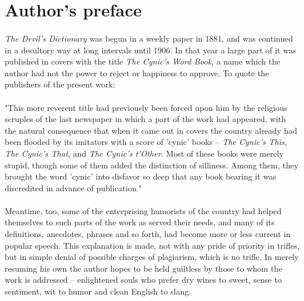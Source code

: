 \documentclass[11pt]{article}
\begin{document}
\newpage



\vspace*{7 cm}

\section*{Author's preface}

\paragraph{}
{\em The Devil's Dictionary} was begun in a weekly paper in 1881, and was
continued in a desultory way at long intervals until 1906.  In that
year a large part of it was published in covers with the title {\em The
Cynic's Word Book}, a name which the author had not the power to
reject or happiness to approve.  To quote the publishers of the
present work:

\paragraph{}
"This more reverent title had previously been forced upon him by
the religious scruples of the last newspaper in which a part of the
work had appeared, with the natural consequence that when it came out
in covers the country already had been flooded by its imitators with a
score of 'cynic' books -- {\em The Cynic's This}, {\em The Cynic's That}, and
{\em The Cynic's t'Other}.  Most of these books were merely stupid, though
some of them added the distinction of silliness.  Among them, they
brought the word 'cynic' into disfavor so deep that any book bearing
it was discredited in advance of publication."

\paragraph{}
Meantime, too, some of the enterprising humorists of the country
had helped themselves to such parts of the work as served their needs,
and many of its definitions, anecdotes, phrases and so forth, had
become more or less current in popular speech.  This explanation is
made, not with any pride of priority in trifles, but in simple denial
of possible charges of plagiarism, which is no trifle.  In merely
resuming his own the author hopes to be held guiltless by those to
whom the work is addressed -- enlightened souls who prefer dry wines
to sweet, sense to sentiment, wit to humor and clean English to slang.
\end{document}
